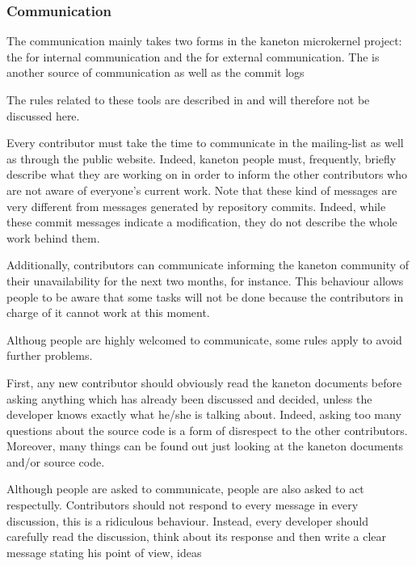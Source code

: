 
\subsubsection{Communication}

The communication mainly takes two forms in the kaneton microkernel project:
the  for internal communication and the  for external communication. The  is another
source of communication as well as the commit logs \etc{}

The rules related to these tools are described in  and will therefore not be discussed here.

Every contributor must take the time to communicate in the mailing-list as well
as through the public website. Indeed, kaneton people must, frequently,
briefly describe what they are working on in order to inform the other
contributors who are not aware of everyone's current work. Note that these
kind of messages are very different from messages generated by repository
commits. Indeed, while these commit messages indicate a modification, they
do not describe the whole work behind them.

Additionally, contributors can communicate informing the kaneton community of
their unavailability for the next two months, for instance. This behaviour
allows people to be aware that some tasks will not be done because the
contributors in charge of it cannot work at this moment.

Althoug people are highly welcomed to communicate, some rules apply to
avoid further problems.

First, any new contributor should obviously read the kaneton documents before
asking anything which has already been discussed and decided, unless the
developer knows exactly what he/she is talking about. Indeed, asking too many
questions about the source code is a form of disrespect to the other
contributors. Moreover, many things can be found out just looking at the
kaneton documents and/or source code.

Although people are asked to communicate, people are also asked to act
respectully. Contributors should not respond to every message in every
discussion, this is a ridiculous behaviour. Instead, every developer should
carefully read the discussion, think about its response and then write a clear
message stating his point of view, ideas \etc{}

